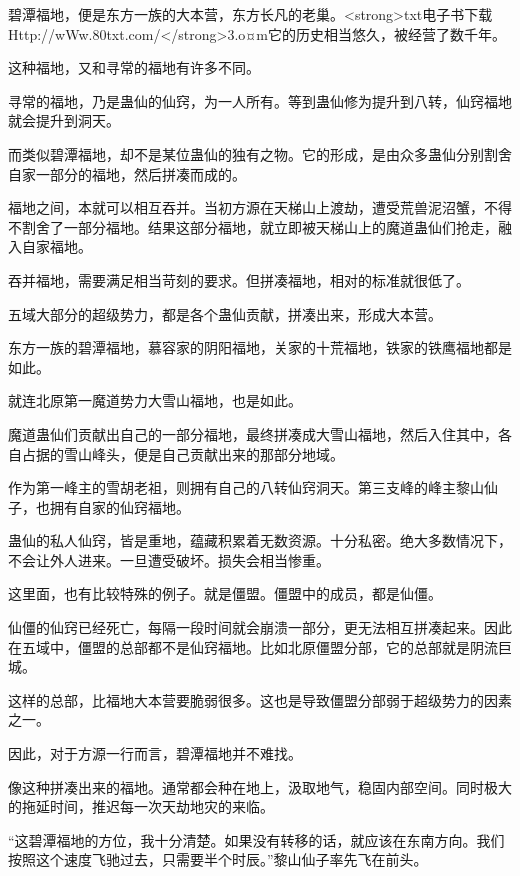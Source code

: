 
\begin{this_body}

碧潭福地，便是东方一族的大本营，东方长凡的老巢。<strong>txt电子书下载Http://wWw.80txt.com/</strong>3.o¤m它的历史相当悠久，被经营了数千年。

这种福地，又和寻常的福地有许多不同。

寻常的福地，乃是蛊仙的仙窍，为一人所有。等到蛊仙修为提升到八转，仙窍福地就会提升到洞天。

而类似碧潭福地，却不是某位蛊仙的独有之物。它的形成，是由众多蛊仙分别割舍自家一部分的福地，然后拼凑而成的。

福地之间，本就可以相互吞并。当初方源在天梯山上渡劫，遭受荒兽泥沼蟹，不得不割舍了一部分福地。结果这部分福地，就立即被天梯山上的魔道蛊仙们抢走，融入自家福地。

吞并福地，需要满足相当苛刻的要求。但拼凑福地，相对的标准就很低了。

五域大部分的超级势力，都是各个蛊仙贡献，拼凑出来，形成大本营。

东方一族的碧潭福地，慕容家的阴阳福地，关家的十荒福地，铁家的铁鹰福地都是如此。

就连北原第一魔道势力大雪山福地，也是如此。

魔道蛊仙们贡献出自己的一部分福地，最终拼凑成大雪山福地，然后入住其中，各自占据的雪山峰头，便是自己贡献出来的那部分地域。

作为第一峰主的雪胡老祖，则拥有自己的八转仙窍洞天。第三支峰的峰主黎山仙子，也拥有自家的仙窍福地。

蛊仙的私人仙窍，皆是重地，蕴藏积累着无数资源。十分私密。绝大多数情况下，不会让外人进来。一旦遭受破坏。损失会相当惨重。

这里面，也有比较特殊的例子。就是僵盟。僵盟中的成员，都是仙僵。

仙僵的仙窍已经死亡，每隔一段时间就会崩溃一部分，更无法相互拼凑起来。因此在五域中，僵盟的总部都不是仙窍福地。比如北原僵盟分部，它的总部就是阴流巨城。

这样的总部，比福地大本营要脆弱很多。这也是导致僵盟分部弱于超级势力的因素之一。

因此，对于方源一行而言，碧潭福地并不难找。

像这种拼凑出来的福地。通常都会种在地上，汲取地气，稳固内部空间。同时极大的拖延时间，推迟每一次天劫地灾的来临。

“这碧潭福地的方位，我十分清楚。如果没有转移的话，就应该在东南方向。我们按照这个速度飞驰过去，只需要半个时辰。”黎山仙子率先飞在前头。


\end{this_body}
